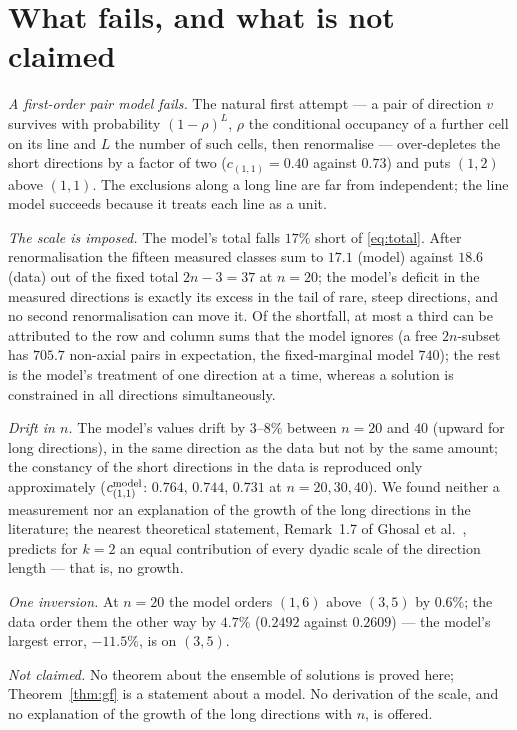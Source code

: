 \documentclass[11pt,a4paper]{article}
\begin{document}
\section{What fails, and what is not claimed}
\emph{A first-order pair model fails.}  The natural first attempt --- a pair of direction $v$ survives with probability
$(1-\rho)^{L}$, $\rho$ the conditional occupancy of a further cell on its line and $L$ the number of such cells, then
renormalise --- over-depletes the short directions by a factor of two ($c_{(1,1)}=0.40$ against $0.73$) and puts $(1,2)$
above $(1,1)$.  The exclusions along a long line are far from independent; the line model succeeds because it treats
each line as a unit.

\emph{The scale is imposed.}  The model's total falls $17\%$ short of \eqref{eq:total}.  After renormalisation the
fifteen measured classes sum to $17.1$ (model) against $18.6$ (data) out of the fixed total $2n-3=37$ at $n=20$; the
model's deficit in the measured directions is exactly its excess in the tail of rare, steep directions, and no second
renormalisation can move it.  Of the shortfall, at most a third can be attributed to the row and column sums that the
model ignores (a free $2n$-subset has $705.7$ non-axial pairs in expectation, the fixed-marginal model $740$);
the rest is the model's treatment of one direction at a time, whereas a solution is constrained in all directions
simultaneously.

\emph{Drift in $n$.}  The model's values drift by $3$--$8\%$ between $n=20$ and $40$ (upward for long directions),
in the same direction as the data but not by the same amount; the constancy of the short directions in the data is
reproduced only approximately ($c^{\rm model}_{(1,1)}$: $0.764$, $0.744$, $0.731$ at $n=20,30,40$).  We found neither
a measurement nor an explanation of the growth of the long directions in the literature; the nearest theoretical
statement, Remark~1.7 of Ghosal et al.\ \cite{Ghosal}, predicts for $k=2$ an equal contribution of every dyadic scale
of the direction length --- that is, no growth.

\emph{One inversion.}  At $n=20$ the model orders $(1,6)$ above $(3,5)$ by $0.6\%$; the data order them the other way by
$4.7\%$ ($0.2492$ against $0.2609$) --- the model's largest error, $-11.5\%$, is on $(3,5)$.

\emph{Not claimed.}  No theorem about the ensemble of solutions is proved here; Theorem~\ref{thm:gf} is a statement
about a model.  No derivation of the scale, and no explanation of the growth of the long directions with $n$, is
offered.
\end{document}
